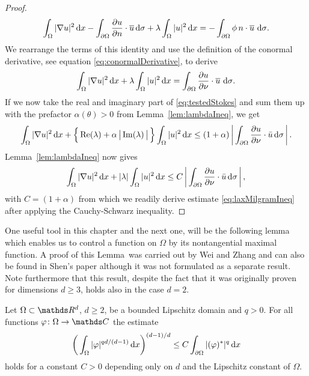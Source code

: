\begin{proof}
  \begin{align*}
    \int_\Omega |\nabla u|^2 \, {\operatorname{d}\!{x}} - \int_{\partial\Omega} \frac{\partial u}{\partial n} \cdot \overline u \, {\operatorname{d}\!{\sigma}} + \lambda \int_\Omega |u|^2 \, {\operatorname{d}\!{x}} = - \int_{\partial\Omega}  \phi\, n \cdot \overline u \, \, {\operatorname{d}\!{\sigma}}.
  \end{align*}
  We rearrange the terms of this identity and use the definition of the conormal derivative, see equation \eqref{eq:conormalDerivative}, to derive
  \begin{align}
    \label{eq:testedStokes}
    \int_\Omega |\nabla u|^2 \, {\operatorname{d}\!{x}} + \lambda \int_\Omega |u|^2 \, {\operatorname{d}\!{x}} = \int_{\partial\Omega} \frac{\partial u}{\partial \nu} \cdot \overline u \, \, {\operatorname{d}\!{\sigma}}.
  \end{align}
  If we now take the real and imaginary part of \eqref{eq:testedStokes} and sum them up with the prefactor $\alpha(\theta) > 0$ from Lemma~\ref{lem:lambdaIneq}, we get
  \begin{align*}
    \int_\Omega |\nabla u|^2 \, {\operatorname{d}\!{x}} + \Big\{ \operatorname{Re}(\lambda) + \alpha\, \big|\operatorname{Im}(\lambda)\,\big|\, \Big\} \int_\Omega |u|^2 \, {\operatorname{d}\!{x}}
    \leq (1 + \alpha) \, \bigg| \int_{\partial\Omega} \frac{\partial u}{\partial \nu} \cdot \bar u \, {\operatorname{d}\!{\sigma}} \, \bigg|\,.
  \end{align*}
  Lemma~\ref{lem:lambdaIneq} now gives
  \begin{align*}
    \int_\Omega |\nabla u|^2 \, {\operatorname{d}\!{x}} + |\lambda| \int_\Omega |u|^2 \, {\operatorname{d}\!{x}} \leq C\,  \bigg| \int_{\partial\Omega} \frac{\partial u}{\partial \nu} \cdot \bar u \, {\operatorname{d}\!{\sigma}}\, \bigg|\,,
  \end{align*}
  with $C = (1 + \alpha)$ from which we readily derive estimate \eqref{eq:laxMilgramIneq} after applying the Cauchy-Schwarz inequality.
\end{proof}

One useful tool in this chapter and the next one, will be the following lemma which enables us to control a function on $\Omega$ by its nontangential maximal function. 
A proof of this Lemma~was carried out by Wei and Zhang \cite[Lem.\@~3.3]{weiZhang} and can also be found in Shen's paper \cite[p.\@~418f.]{Shen2012} although it was not formulated as a separate result.
Note furthermore that this result, despite the fact that it was originally proven for dimensions $d \geq 3$, holds also in the case $d = 2$.

\begin{lem}
  \label{lem:weiZhang}
  Let $\Omega \subset \R^d$, $d \geq 2$, be a bounded Lipschitz domain and $q > 0$.
  For all functions $\varphi \colon \Omega \to \C$ the estimate
  \begin{align}
    \label{eq:weizhangestimate}
    \bigg(\int_{\Omega} |\varphi|^{qd/(d - 1)} \, {\operatorname{d}\!{x}} \bigg)^{(d - 1)/d}
    \leq C \int_{\partial\Omega} |(\varphi)^*|^q \, {\operatorname{d}\!{x}}
  \end{align}
  holds for a constant $C > 0$ depending only on $d$ and the Lipschitz constant of $\Omega$.
\end{lem}

